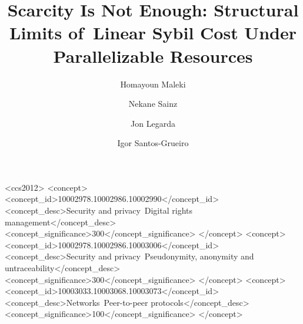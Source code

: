 \documentclass[manuscript,review]{acmart}
\theoremstyle{remark}
\begin{document}
	
	\begin{CCSXML}
		<ccs2012>
		<concept>
		<concept_id>10002978.10002986.10002990</concept_id>
		<concept_desc>Security and privacy~Digital rights management</concept_desc>
		<concept_significance>300</concept_significance>
		</concept>
		<concept>
		<concept_id>10002978.10002986.10003006</concept_id>
		<concept_desc>Security and privacy~Pseudonymity, anonymity and untraceability</concept_desc>
		<concept_significance>300</concept_significance>
		</concept>
		<concept>
		<concept_id>10003033.10003068.10003073</concept_id>
		<concept_desc>Networks~Peer-to-peer protocols</concept_desc>
		<concept_significance>100</concept_significance>
		</concept>
	\end{CCSXML}
	
	
	\title{Scarcity Is Not Enough: Structural Limits of\
		Linear Sybil Cost Under Parallelizable Resources}
	
	
	\author{Homayoun Maleki}
	
	\author{Nekane Sainz}
	
	\author{Jon Legarda}
	
	\author{Igor Santos-Grueiro}
	
\end{document}
